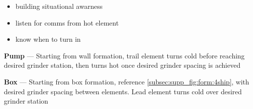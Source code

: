 \begin{tcoloritemize}
    \begin{itemize}
        \item building situational awarness
        \item listen for comms from hot element
        \item know when to turn in
    \end{itemize}

    \textbf{Pump}
    --- Starting from wall formation, trail element turns cold before reaching desired grinder station,
    then turns hot once desired grinder spacing is achieved

    \bigskip

    \textbf{Box}
    --- Starting from box formation, 
    reference \cref{subsec:supp_fig:form:4ship}, 
    with desired grinder spacing between elements.
    Lead element turns cold over desired grinder station
\end{tcoloritemize}


